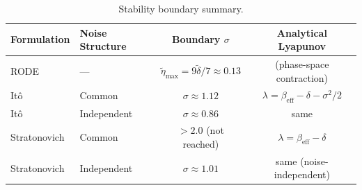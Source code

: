 \documentclass[12pt]{article}
\begin{document}
\begin{table}[htbp]
  \centering
  \caption{Stability boundary summary.}
  \label{tab:stability}
  \begin{tabular}{llcc}
    \toprule
    Formulation & Noise Structure & Boundary $\sigma$ & Analytical Lyapunov \\
    \midrule
    RODE & --- & $\tilde{\eta}_{\max} = 9\tilde{\delta}/7 \approx 0.13$ & (phase-space contraction) \\
    It\^{o} & Common & $\sigma \approx 1.12$ & $\lambda = \beta_{\text{eff}} - \delta - \sigma^2/2$ \\
    It\^{o} & Independent & $\sigma \approx 0.86$ & same \\
    Stratonovich & Common & $> 2.0$ (not reached) & $\lambda = \beta_{\text{eff}} - \delta$ \\
    Stratonovich & Independent & $\sigma \approx 1.01$ & same (noise-independent) \\
    \bottomrule
  \end{tabular}
\end{table}




\end{document}
